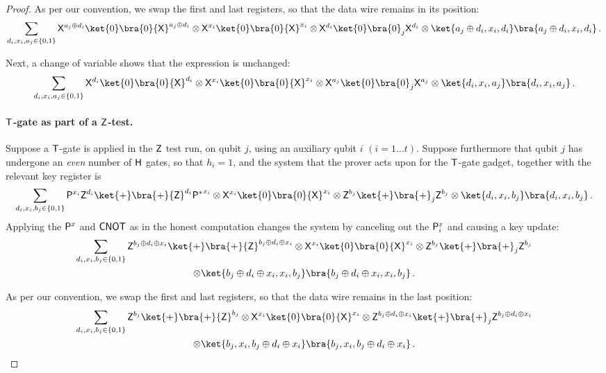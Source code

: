 \documentclass{toc}
\newcommand{\hgate}{{\sf H}}
\newcommand{\pgate}{{\sf P}}
\newcommand{\tgate}{{\sf T}}
\newcommand{\xgate}{{\sf X}}
\newcommand{\zgate}{{\sf Z}}
\newcommand{\cnot}{{\sf CNOT}}
\newcommand{\ketbra}[2]{\ket{#1}\bra{#2}}			%
\newcommand{\egoketbra}[1]{\ketbra{#1}{#1}}			%
\begin{document}
\begin{proof}
As per our convention, we swap the first and last registers, so that the data wire remains in its position:
\begin{equation}
\sum_{d_i,x_i,a_j \in \{0,1\}}\xgate^{a_j\oplus {d_i}}\egoketbra{0}\xgate^{a_j \oplus d_i}
  \otimes \xgate^{x_i}\egoketbra{0}\xgate^{x_i} \otimes\xgate^{d_i}\egoketbra{0}_j\xgate^{d_i}\otimes \egoketbra{a_j \oplus d_i,  x_i, d_i }\,.
\end{equation}


Next, a  change of variable  shows that the expression is unchanged:
\begin{equation}
\sum_{d_i,x_i,a_j \in \{0,1\}}\xgate^{d_i}\egoketbra{0}\xgate^{d_i}
  \otimes \xgate^{x_i}\egoketbra{0}\xgate^{x_i} \otimes\xgate^{a_j}\egoketbra{0}_j\xgate^{a_j}\otimes \egoketbra{d_i,  x_i, a_j }\,.
\end{equation}

\paragraph{$\tgate$-gate  as part of a $\zgate$-test.}
Suppose a $\tgate$-gate is applied in the $\zgate$ test run, on qubit $j$, using an auxiliary qubit  $i$ $(i = 1 \ldots t)$. Suppose furthermore that qubit $j$ has undergone an \emph{even} number of $\hgate$ gates, so that $h_i =1$, and the system that the prover acts upon for the $\tgate$-gate gadget,  together with the relevant key register is %
%
\begin{equation}
\label{eq:start-z-test}
\sum_{d_i,x_i,b_j \in \{0,1\}} \pgate^{x_i}\zgate^{d_i}\egoketbra{+}\zgate^{d_i}{\pgate^*}^{x_i}\otimes \xgate^{x_i}\egoketbra{0}\xgate^{x_i} \otimes \zgate^{b_j}\egoketbra{+}_j\zgate^{b_j}  \otimes \egoketbra{d_i, x_i, b_j}\,.
\end{equation}
Applying the $\pgate^x$ and $\cnot$ as in the honest computation  changes the system by canceling out the $\pgate^x_i$ and causing a key update:
\begin{multline}
\sum_{d_i,x_i,b_j \in \{0,1\}} \zgate^{b_j \oplus d_i \oplus x_i}\egoketbra{+}\zgate^{b_j \oplus d_i \oplus x_i}\otimes \xgate^{x_i}\egoketbra{0} \xgate^{x_i} \otimes
\zgate^{b_j} \egoketbra{+}_j\zgate^{b_j}\\  \otimes \egoketbra{b_j \oplus d_i \oplus x_i, x_i, b_j}\,.
\end{multline}

 As per our convention, we swap the first and last registers, so that the data wire remains in the last position:
 \begin{multline}
\sum_{d_i,x_i,b_j \in \{0,1\}} \zgate^{b_j}\egoketbra{+}\zgate^{b_j} \otimes \xgate^{x_i}\egoketbra{0}\xgate^{x_i} \otimes
\zgate^{b_j \oplus d_i \oplus x_i}\egoketbra{+}_j\zgate^{b_j \oplus d_i \oplus x_i}\\\otimes \egoketbra{b_j, x_i, b_j \oplus d_i \oplus x_i}\,.
\end{multline}


\end{proof}
\end{document}
